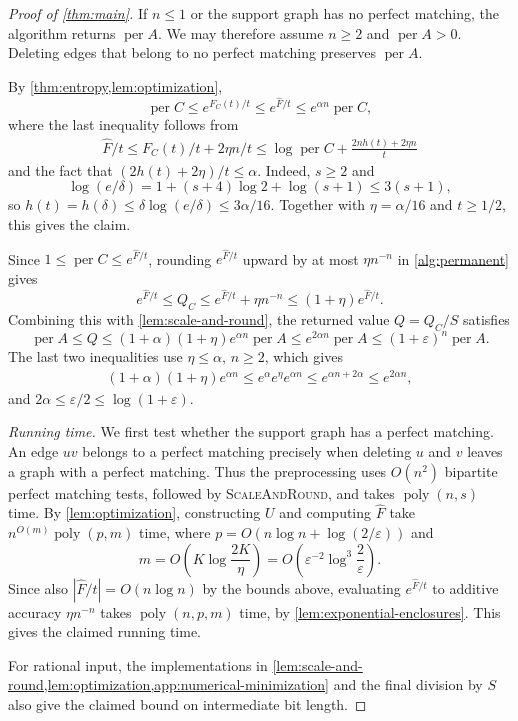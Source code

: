 \documentclass[11pt,reqno,letterpaper]{amsart}
\numberwithin{equation}{section}
\theoremstyle{definition}
\theoremstyle{remark}
\DeclareMathOperator{\per}{per}
\begin{document}
\begin{proof}[Proof of \cref{thm:main}]
If $n\le1$ or the support graph has no perfect matching,
the algorithm returns $\per A$.
We may therefore assume $n\ge2$ and $\per A>0$.
Deleting edges that belong to no perfect matching preserves $\per A$.

By \cref{thm:entropy,lem:optimization},
\[
 \per C
 \le e^{F_C(t)/t}
 \le e^{\widehat F/t}
 \le e^{\alpha n}\per C,
\]
where the last inequality follows from
\begin{align*}
    \widehat F/t\leq F_C(t)/t+2\eta n/t\leq \log\per C+\frac{2nh(t)+2\eta n}{t}
\end{align*}
and the fact that
$(2h(t)+2\eta)/t\le\alpha$. Indeed, $s\ge2$ and
\[
 \log(e/\delta)=1+(s+4)\log2+\log(s+1)\le3(s+1),
\]
so $h(t)=h(\delta)\le\delta\log(e/\delta)\le3\alpha/16$.
Together with $\eta=\alpha/16$ and $t\ge1/2$, this gives the claim.

Since $1\le\per C\le e^{\widehat F/t}$, rounding
$e^{\widehat F/t}$ upward by at most $\eta n^{-n}$ in \cref{alg:permanent} gives
\[
 e^{\widehat F/t}\le Q_C
 \le e^{\widehat F/t}+\eta n^{-n}
 \le(1+\eta)e^{\widehat F/t}.
\]
Combining this with \cref{lem:scale-and-round}, the returned value
$Q=Q_C/S$ satisfies
\[
 \per A
 \le Q
 \le(1+\alpha)(1+\eta)e^{\alpha n}\per A
 \le e^{2\alpha n}\per A
 \le(1+\varepsilon)^n\per A.
\]
The last two inequalities use $\eta\le\alpha$, $n\ge2$, which gives
\begin{align*}
(1+\alpha)(1+\eta)e^{\alpha n}\leq e^{\alpha}e^{\eta}e^{\alpha n}\leq e^{\alpha n+2\alpha}\leq e^{2\alpha n},
\end{align*}
and
$2\alpha\le\varepsilon/2\le\log(1+\varepsilon)$.

\smallskip
\noindent\emph{Running time.}
We first test whether the support graph has a perfect matching.
An edge $uv$ belongs to a perfect matching precisely when deleting
$u$ and $v$ leaves a graph with a perfect matching.
Thus the preprocessing uses $O(n^2)$ bipartite perfect matching tests,
followed by \textsc{ScaleAndRound}, and takes
$\operatorname{poly}(n,s)$ time.
By \cref{lem:optimization}, constructing $U$ and computing
$\widehat F$ take $n^{O(m)}\operatorname{poly}(p,m)$ time, where
$p=O(n\log n+\log(2/\varepsilon))$ and
\begin{equation*}
 m=O\!\left(K\log\frac{2K}{\eta}\right)
  =O\!\left(\varepsilon^{-2}\log^3\frac2\varepsilon\right).
\end{equation*}
Since also $|\widehat F/t|=O(n\log n)$ by the bounds above,
evaluating $e^{\widehat F/t}$ to additive accuracy
$\eta n^{-n}$ takes $\operatorname{poly}(n,p,m)$ time,
by \cref{lem:exponential-enclosures}.
This gives the claimed running time.

For rational input, the implementations in
\cref{lem:scale-and-round,lem:optimization,app:numerical-minimization}
and the final division by $S$ also give the claimed
bound on intermediate bit length.
\end{proof}
\end{document}
